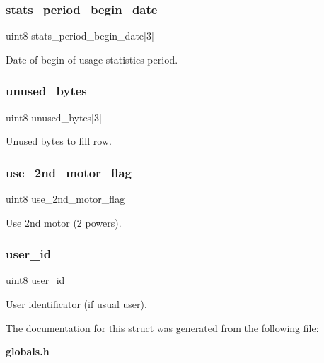 \subsubsection{stats\+\_\+period\+\_\+begin\+\_\+date}
{\footnotesize\ttfamily uint8 stats\+\_\+period\+\_\+begin\+\_\+date[3]}

Date of begin of usage statistics period. \mbox{\label{structst__device_aa1537c1e30116f5e2ee8dee11239a067}} 
\subsubsection{unused\+\_\+bytes}
{\footnotesize\ttfamily uint8 unused\+\_\+bytes[3]}

Unused bytes to fill row. \mbox{\label{structst__device_a0fccac3f6be3d4a46e0165630c61915c}} 
\subsubsection{use\+\_\+2nd\+\_\+motor\+\_\+flag}
{\footnotesize\ttfamily uint8 use\+\_\+2nd\+\_\+motor\+\_\+flag}

Use 2nd motor (2 powers). \mbox{\label{structst__device_ad9392e6d3c353068737d39075256a397}} 
\subsubsection{user\+\_\+id}
{\footnotesize\ttfamily uint8 user\+\_\+id}

User identificator (if usual user). 

The documentation for this struct was generated from the following file\+:\begin{DoxyCompactItemize}
\item 
\textbf{ globals.\+h}\end{DoxyCompactItemize}
